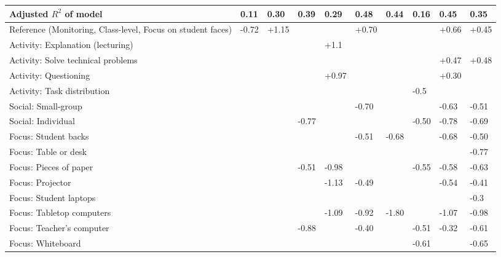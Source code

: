 \documentclass[10pt,journal,compsoc]{IEEEtran}
\begin{document}
\begin{table}[!t]
\begin{tabular}{|p{3cm}||p{1.2cm}|p{1.2cm}|p{1.2cm}|p{1.2cm}|p{1.2cm}|p{1.2cm}|p{1.2cm}|p{1.2cm}|p{1.2cm}|}
  \hline
  Adjusted $R^2$ of model & 0.11 & 0.30 & 0.39 & 0.29 & 0.48 & 0.44 & 0.16 & 0.45 & 0.35 \\ 
  \hline
   \hline
  Reference (Monitoring, Class-level, Focus on student faces) & -0.72 &  +1.15 &     &     &  +0.70 &     &     &  +0.66 &  +0.45 \\ 
   \hline
  Activity: Explanation (lecturing) &   &   &   & +1.1 &   &   &   &   &   \\ 
   \hline
  Activity: Solve technical problems &    &    &    &    &    &    &    & +0.47 & +0.48 \\ 
   \hline
  Activity: Questioning &    &    &    & +0.97 &    &    &    & +0.30 &    \\ 
   \hline
  Activity: Task distribution &    &    &    &    &    &    & -0.5 &    &    \\ 
   \hline
  Social: Small-group &     &     &     &     & -0.70 &     &     & -0.63 & -0.51 \\ 
   \hline
  Social: Individual &     &     & -0.77 &     &     &     & -0.50 & -0.78 & -0.69 \\ 
   \hline
  Focus: Student backs &     &     &     &     & -0.51 & -0.68 &     & -0.68 & -0.50 \\ 
   \hline
  Focus: Table or desk &     &     &     &     &     &     &     &     & -0.77 \\ 
   \hline
  Focus: Pieces of paper &     &     & -0.51 & -0.98 &     &     & -0.55 & -0.58 & -0.63 \\ 
   \hline
  Focus: Projector &     &     &     & -1.13 & -0.49 &     &     & -0.54 & -0.41 \\ 
   \hline
  Focus: Student laptops &    &    &    &    &    &    &    &    & -0.3 \\ 
   \hline
  Focus: Tabletop computers &     &     &     & -1.09 & -0.92 & -1.80 &     & -1.07 & -0.98 \\ 
   \hline
  Focus: Teacher's computer &     &     & -0.88 &     & -0.40 &     & -0.51 & -0.32 & -0.61 \\ 
   \hline
  Focus: Whiteboard &     &     &     &     &     &     & -0.61 &     & -0.65 \\ 
   \hline
\end{tabular}
\end{table}
\end{document}

